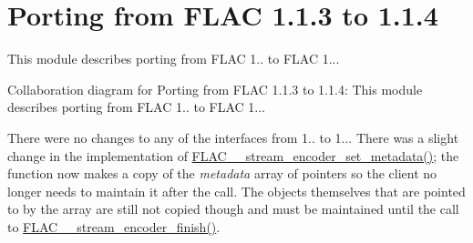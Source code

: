 \hypertarget{group__porting__1__1__3__to__1__1__4}{}\section{Porting from F\+L\+AC 1.1.3 to 1.1.4}
\label{group__porting__1__1__3__to__1__1__4}


This module describes porting from F\+L\+AC 1.. to F\+L\+AC 1...  


Collaboration diagram for Porting from F\+L\+AC 1.1.3 to 1.1.4\+:
This module describes porting from F\+L\+AC 1.. to F\+L\+AC 1... 

There were no changes to any of the interfaces from 1.. to 1... There was a slight change in the implementation of \hyperlink{group__flac__stream__encoder_ga67b30b1a67a9274f7708a22154b225f6}{F\+L\+A\+C\+\_\+\+\_\+stream\+\_\+encoder\+\_\+set\+\_\+metadata()}; the function now makes a copy of the {\itshape metadata} array of pointers so the client no longer needs to maintain it after the call. The objects themselves that are pointed to by the array are still not copied though and must be maintained until the call to \hyperlink{group__flac__stream__encoder_gab2c1e5477c1e3fe9ad0d722ff8eecda2}{F\+L\+A\+C\+\_\+\+\_\+stream\+\_\+encoder\+\_\+finish()}. 